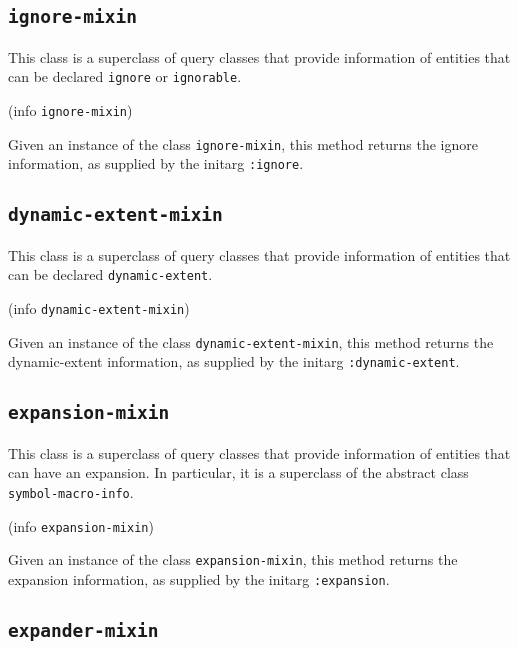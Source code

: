 \subsection{\texttt{ignore-mixin}}


This class is a superclass of query classes that provide information
of entities that can be declared \texttt{ignore} or \texttt{ignorable}.


 {(info {\tt ignore-mixin})}

Given an instance of the class \texttt{ignore-mixin}, this method
returns the ignore information, as supplied by the initarg
\texttt{:ignore}.

\subsection{\texttt{dynamic-extent-mixin}}


This class is a superclass of query classes that provide information
of entities that can be declared \texttt{dynamic-extent}.


 {(info {\tt dynamic-extent-mixin})}

Given an instance of the class \texttt{dynamic-extent-mixin}, this method
returns the dynamic-extent information, as supplied by the initarg
\texttt{:dynamic-extent}.

\subsection{\texttt{expansion-mixin}}

This class is a superclass of query classes that provide information
of entities that can have an expansion.  In particular, it is a
superclass of the abstract class \texttt{symbol-macro-info}.


 {(info {\tt expansion-mixin})}

Given an instance of the class \texttt{expansion-mixin}, this method
returns the expansion information, as supplied by the initarg
\texttt{:expansion}.

\subsection{\texttt{expander-mixin}}

